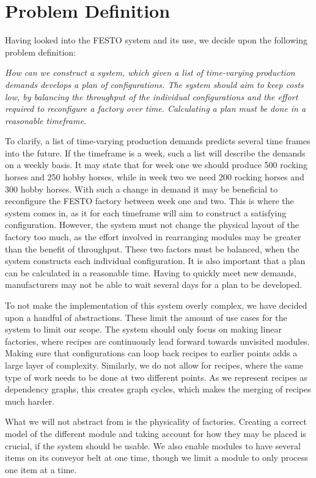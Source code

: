 \chapter{Problem Definition}\label{ch:problemdefinition}
Having looked into the FESTO system and its use, we decide upon the following problem definition:


\textit{How can we construct a system, which given a list of time-varying production demands  develops a plan of configurations. The system should aim to keep costs low, by balancing the throughput of the individual configurations and the effort required to reconfigure a factory over time. Calculating a plan must be done in a reasonable timeframe.}


To clarify, a list of time-varying production demands predicts several time frames into the future. If the timeframe is a week, such a list will describe the demands on a weekly basis. It may state that for week one we should produce 500 rocking horses and 250 hobby horses, while in week two we need 200 rocking horses and 300 hobby horses. With such a change in demand it may be beneficial to reconfigure the FESTO factory between week one and two. This is where the system comes in, as it for each timeframe will aim to construct a satisfying configuration. However, the system must not change the physical layout of the factory too much, as the effort involved in rearranging modules may be greater than the benefit of throughput. These two factors must be balanced, when the system constructs each individual configuration. It is also important  that a plan can be calculated in a reasonable time. Having to quickly meet new demands, manufacturers may not be able to wait several days for a plan to be developed.


To not make the implementation of this system overly complex, we have decided upon a handful of abstractions. These limit the amount of use cases for the system to limit our scope.  The system should only focus on making linear factories, where recipes are continuously lead forward towards  unvisited modules. Making sure that configurations can loop back recipes to earlier points adds a large layer of complexity. Similarly, we do not allow for recipes, where the same type of work needs to be done at two different points. As we represent recipes as dependency graphs, this creates graph cycles, which makes the merging of recipes much harder. 


What we will not abstract from is the physicality of factories. Creating a correct model of the different module and taking account for how they may be placed is crucial, if the system should be usable.  We also enable modules to have several items on its conveyor belt at one time, though we limit a module to only process one item at a time. 
